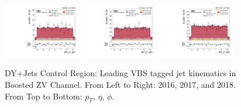 \begin{figure}[!ht]
  \includegraphics[width=0.30\textwidth]{analysis_plots/2016_zv/cr_vjets_l/vbf_j1_phi.pdf}
  \includegraphics[width=0.30\textwidth]{analysis_plots/2017_zv/cr_vjets_l/vbf_j1_phi.pdf}
  \includegraphics[width=0.30\textwidth]{analysis_plots/2018_zv/cr_vjets_l/vbf_j1_phi.pdf} \\
  \caption[DY+Jets Control Region: Leading VBS tagged jet kinematics in Boosted ZV Channel]%
  {DY+Jets Control Region: Leading VBS tagged jet kinematics in Boosted ZV Channel. From Left to Right: 2016,
    2017, and 2018. From Top to Bottom: \( p_T \), \( \eta \), \( \phi \).}%
  \label{fig:zv-cr-vjets-l-vbs1-pt-eta-m}
\end{figure}

